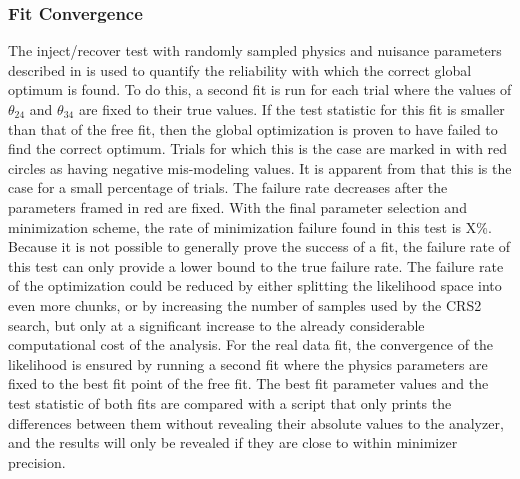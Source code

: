 
\subsubsection{Fit Convergence}

The inject/recover test with randomly sampled physics and nuisance parameters described in  is used to quantify the reliability with which the correct global optimum is found.
To do this, a second fit is run for each trial where the values of $\theta_{24}$ and $\theta_{34}$ are fixed to their true values.
If the test statistic for this fit is smaller than that of the free fit, then the global optimization is proven to have failed to find the correct optimum.
Trials for which this is the case are marked in  with red circles as having negative mis-modeling values.
It is apparent from  that this is the case for a small percentage of trials.
The failure rate decreases after the parameters framed in red are fixed.
With the final parameter selection and minimization scheme, the rate of minimization failure found in this test is X\%.
Because it is not possible to generally prove the success of a fit, the failure rate of this test can only provide a lower bound to the true failure rate.
The failure rate of the optimization could be reduced by either splitting the likelihood space into even more chunks, or by increasing the number of samples used by the \textsc{CRS2} search, but only at a significant increase to the already considerable computational cost of the analysis.
For the real data fit, the convergence of the likelihood is ensured by running a second fit where the physics parameters are fixed to the best fit point of the free fit.
The best fit parameter values and the test statistic of both fits are compared with a script that only prints the differences between them without revealing their absolute values to the analyzer, and the results will only be revealed if they are close to within minimizer precision.

